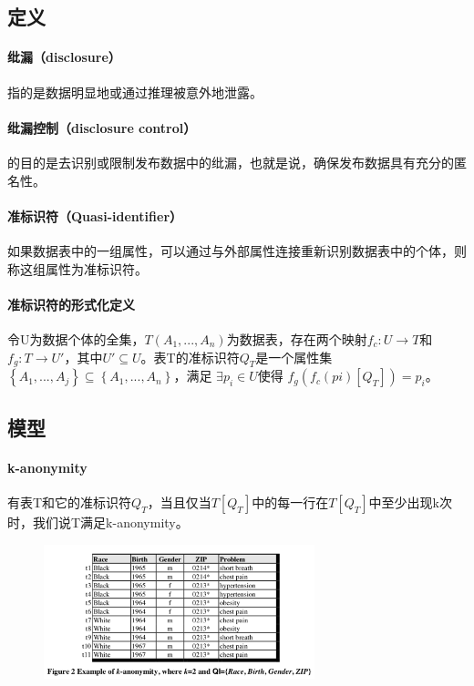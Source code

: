 \documentclass[12pt,a4paper]{article}
\begin{document}
\subsection{定义}
\paragraph{纰漏（disclosure）}指的是数据明显地或通过推理被意外地泄露。
\paragraph{纰漏控制（disclosure control）} 的目的是去识别或限制发布数据中的纰漏，也就是说，确保发布数据具有充分的匿名性。
\paragraph{准标识符（Quasi-identifier）} 如果数据表中的一组属性，可以通过与外部属性连接重新识别数据表中的个体，则称这组属性为准标识符。
\paragraph{准标识符的形式化定义} 令U为数据个体的全集，$T(A_1,...,A_n)$为数据表，存在两个映射$f_c: U \rightarrow T$和$f_g: T \rightarrow U'$，其中$U' \subseteq U$。表T的准标识符$Q_T$是一个属性集$\left \{ A_1,...,A_j\right \} \subseteq \left \{ A_1,...,A_n \right \}$，满足 $\exists p_i \in U $使得 $f_g(f_c(pi)[Q_T]) = p_i$。

\subsection{模型}
\paragraph{k-anonymity} 有表T和它的准标识符$Q_T$，当且仅当$T[Q_T]$中的每一行在$T[Q_T]$中至少出现k次时，我们说T满足k-anonymity。
\begin{figure}[H]
	\centering
	\includegraphics[width=0.7\textwidth]{../images/k-anonymity-example.png}
	\caption{}
	\label{}
\end{figure}
\end{document}
